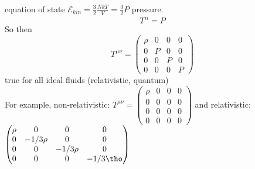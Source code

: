 equation of state $\mathcal E_{kin} = \frac{3}{2}\frac{NkT}{V} = \frac{3}{2}P$ pressure.
\begin{equation}
	T^{ii} = P
\end{equation}
So then
\begin{equation}
	T^{\mu\nu} =
	\begin{pmatrix}
		\rho & 0 & 0 & 0\\
		0 & P & 0 & 0\\
		0 & 0 & P & 0\\
		0 & 0 & 0 & P
	\end{pmatrix}
\end{equation}
true for all ideal fluids (relativistic, quantum)\\
For example, non-relativistic: $T^{\mu\nu} = 
\begin{pmatrix}
	\rho & 0 & 0 & 0\\
	0 & 0 & 0 & 0\\
	0 & 0 & 0 & 0\\
	0 & 0 & 0 & 0
\end{pmatrix}
$
and relativistic: $\begin{pmatrix}
	\rho & 0 & 0 & 0\\
	0 & -1/3\rho & 0 & 0\\
	0 & 0 & -1/3\rho & 0\\
	0 & 0 & 0 & -1/3\tho
\end{pmatrix}$

